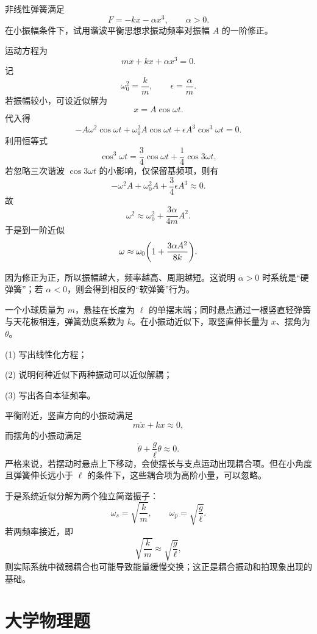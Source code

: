 \begin{competition}
非线性弹簧满足
\[
F=-kx-\alpha x^3,
\qquad \alpha>0.
\]
在小振幅条件下，试用谐波平衡思想求振动频率对振幅 $A$ 的一阶修正。

\begin{solution}
运动方程为
\[
m\ddot x+kx+\alpha x^3=0.
\]
记
\[
\omega_0^2=\frac{k}{m},
\qquad
\epsilon=\frac{\alpha}{m}.
\]
若振幅较小，可设近似解为
\[
x=A\cos\omega t.
\]
代入得
\[
-A\omega^2\cos\omega t+\omega_0^2 A\cos\omega t+\epsilon A^3\cos^3\omega t=0.
\]
利用恒等式
\[
\cos^3\omega t=\frac34\cos\omega t+\frac14\cos3\omega t,
\]
若忽略三次谐波 $\cos3\omega t$ 的小影响，仅保留基频项，则有
\[
-\omega^2A+\omega_0^2A+\frac34\epsilon A^3\approx 0.
\]
故
\[
\omega^2\approx \omega_0^2+\frac{3\alpha}{4m}A^2.
\]
于是到一阶近似
\[
\omega\approx \omega_0\qty(1+\frac{3\alpha A^2}{8k}).
\]

因为修正为正，所以振幅越大，频率越高、周期越短。这说明 $\alpha>0$ 时系统是“硬弹簧”；若 $\alpha<0$，则会得到相反的“软弹簧”行为。
\end{solution}
\end{competition}

\begin{competition}
一个小球质量为 $m$，悬挂在长度为 $\ell$ 的单摆末端；同时悬点通过一根竖直轻弹簧与天花板相连，弹簧劲度系数为 $k$。在小振动近似下，取竖直伸长量为 $x$、摆角为 $\theta$。

(1) 写出线性化方程；

(2) 说明何种近似下两种振动可以近似解耦；

(3) 写出各自本征频率。

\begin{solution}
平衡附近，竖直方向的小振动满足
\[
m\ddot x+kx\approx 0,
\]
而摆角的小振动满足
\[
\ddot\theta+\frac{g}{\ell}\theta\approx 0.
\]
严格来说，若摆动时悬点上下移动，会使摆长与支点运动出现耦合项。但在小角度且弹簧伸长远小于 $\ell$ 的条件下，这些耦合项为高阶小量，可以忽略。

于是系统近似分解为两个独立简谐振子：
\[
\omega_s=\sqrt{\frac{k}{m}},
\qquad
\omega_p=\sqrt{\frac{g}{\ell}}.
\]
若两频率接近，即
\[
\sqrt{\frac{k}{m}}\approx \sqrt{\frac{g}{\ell}},
\]
则实际系统中微弱耦合也可能导致能量缓慢交换；这正是耦合振动和拍现象出现的基础。
\end{solution}
\end{competition}

\section*{大学物理题}

